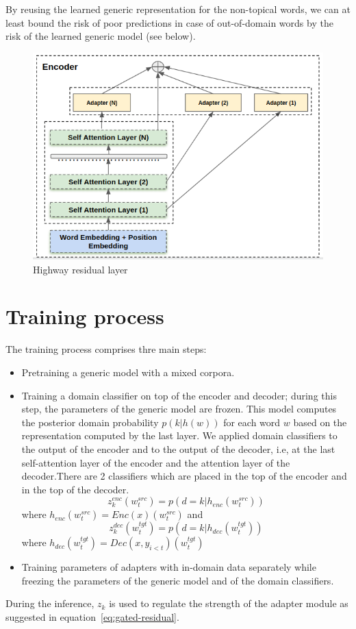 \documentclass[12pt,a4paper,twoside]{report}
\theoremstyle{definition}
\newcommand{\fyTodo}[1]{\Todo[FY:]{\textcolor{orange}{#1}}}
\begin{document}
By reusing the learned generic representation for the non-topical words, we can at least bound the risk of poor predictions in case of out-of-domain words by the risk of the learned generic model (see below).
\begin{figure}[h!]
\includegraphics[scale=0.5]{highway_residual}
\caption{Highway residual layer}
\label{fig:1}
\end{figure}

\section*{Training process}
The training process comprises thre main steps:
\begin{itemize}
\item Pretraining a generic model with a mixed corpora.
\item Training a domain classifier on top of the encoder and decoder; during this step, the parameters of the generic model are frozen. This model computes the posterior domain probability $p(k|h(w))$ for each word $w$ based on the representation computed by the last layer.
We applied domain classifiers to the output of the encoder and to the output of the decoder, i.e, at the last self-attention layer of the encoder and the attention layer of the decoder.There are 2 classifiers which are placed in the top of the encoder and in the top of the decoder.
$$z^{enc}_k(w^{src}_t) = p(d=k| h_{enc}(w^{src}_t))$$
where $h_{enc}(w^{src}_t)=Enc(x)(w^{src}_t)$ and 
$$z^{dec}_k(w^{tgt}_t) = p(d=k| h_{dec}(w^{tgt}_t))$$  
where $h_{dec}(w^{tgt}_t)=Dec(x,y_{i<t})(w^{tgt}_t)$

\fyTodo{Which layer, which classifier ?}
\item Training parameters of adapters with in-domain data separately while freezing the parameters of the generic model and of the domain classifiers.
\end{itemize}
During the inference, $z_k$ is used to regulate the strength of the adapter module as suggested in equation~\ref{eq:gated-residual}.
\end{document}
